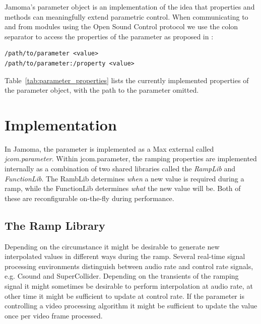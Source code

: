 \documentclass{article}
\begin{document}
Jamoma's parameter object is an implementation of the idea that properties and methods can meaningfully extend parametric control. When communicating to and from modules using the Open Sound Control protocol \cite{Wright:2003} we use the colon separator to access the properties of the parameter as proposed in \cite{Place:2008}:

\begin{small}
\begin{verbatim}
/path/to/parameter <value>
/path/to/parameter:/property <value>
\end{verbatim}
\end{small}

Table~\ref{tab:parameter_properties} lists the currently implemented properties of the parameter object, with the path to the parameter omitted.



\section{Implementation} %
\label{sec:param_implementation}

In Jamoma, the parameter is implemented as a Max external called \emph{jcom.parameter}. Within jcom.parameter, the ramping properties are implemented internally as a combination of two shared libraries called the \emph{RampLib} and \emph{FunctionLib}. The RambLib determines \emph{when} a new value is required during a ramp, while the FunctionLib determines \emph{what} the new value will be. Both of these are reconfigurable on-the-fly during performance.


\subsection{The Ramp Library} %
\label{ssec:ramplib}


Depending on the circumstance it might be desirable to generate new interpolated values in different ways during the ramp. Several real-time signal processing environments distinguish between audio rate and control rate signals, e.g. Csound and SuperCollider. Depending on the transients of the ramping signal it might sometimes be desirable to perform interpolation at audio rate, at other time it might be sufficient to update at  control rate. If the parameter is controlling a video processing algorithm it might be sufficient to update the value once per video frame processed.
\end{document}

